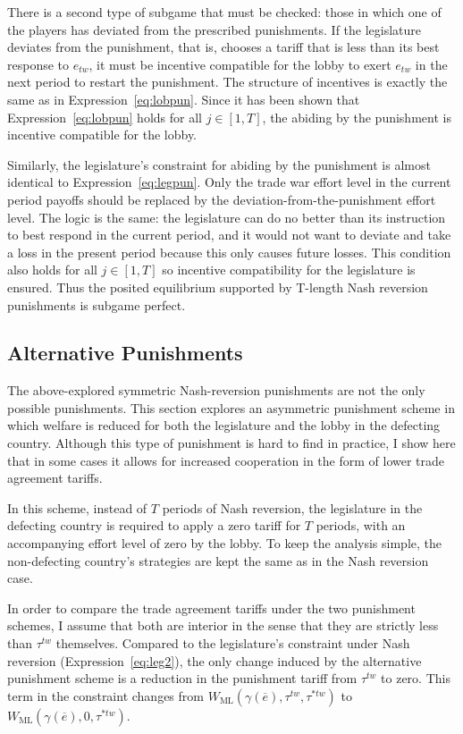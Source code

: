 \documentclass[authoryear, review]{elsarticle}
\newcommand{\ov}{\overline}
\newcommand{\ga}{\gamma}
\begin{document}
There is a second type of subgame that must be checked: those in which one of the players has deviated from the prescribed punishments. If the legislature deviates from the punishment, that is, chooses a tariff that is less than its best response to $e_{tw}$, it must be incentive compatible for the lobby to exert $e_{tw}$ in the next period to restart the punishment. The structure of incentives is exactly the same as in Expression~\ref{eq:lobpun}. Since it has been shown that Expression~\ref{eq:lobpun} holds for all $j \in \left[1,T\right]$, the abiding by the punishment is incentive compatible for the lobby. 

Similarly, the legislature's constraint for abiding by the punishment is almost identical to Expression~\ref{eq:legpun}. Only the trade war effort level in the current period payoffs should be replaced by the deviation-from-the-punishment effort level. The logic is the same: the legislature can do no better than its instruction to best respond in the current period, and it would not want to deviate and take a loss in the present period because this only causes future losses. This condition also holds for all $j \in \left[1,T\right]$ so incentive compatibility for the legislature is ensured. Thus the posited equilibrium supported by T-length Nash reversion punishments is subgame perfect.


\subsection{Alternative Punishments}
\label{sec:asymmetric}
The above-explored symmetric Nash-reversion punishments are not the only possible punishments. This section explores an asymmetric punishment scheme in which welfare is reduced for both the legislature and the lobby in the defecting country. Although this type of punishment is hard to find in practice, I show here that in some cases it allows for increased cooperation in the form of lower trade agreement tariffs.

In this scheme, instead of $T$ periods of Nash reversion, the legislature in the defecting country is required to apply a zero tariff for $T$ periods, with an accompanying effort level of zero by the lobby. To keep the analysis simple, the non-defecting country's strategies are kept the same as in the Nash reversion case.

In order to compare the trade agreement tariffs under the two punishment schemes, I assume that both are interior in the sense that they are strictly less than $\tau^{tw}$ themselves. Compared to the legislature's constraint under Nash reversion (Expression~\ref{eq:leg2}), the only change induced by the alternative punishment scheme is a reduction in the punishment tariff from $\tau^{tw}$ to zero. This term in the constraint changes from $W_\text{ML}(\ga(\ov{e}),\tau^{tw},\tau^{*tw})$ to $W_\text{ML}(\ga(\ov{e}),0,\tau^{*tw})$.
\end{document}
